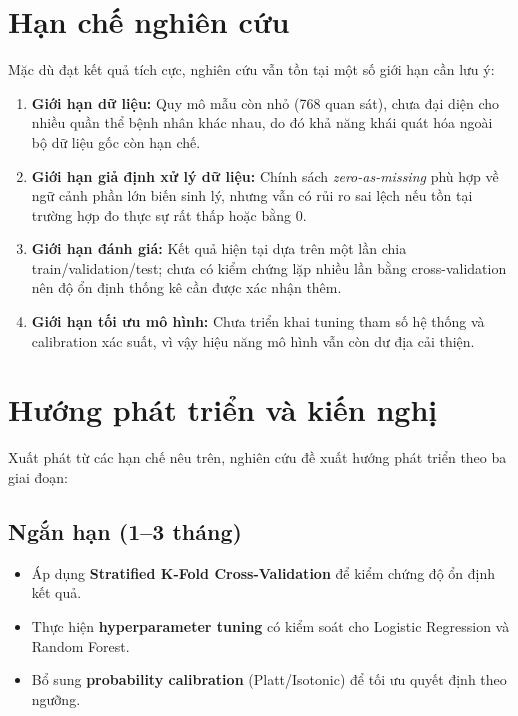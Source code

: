 \section{Hạn chế nghiên cứu}
Mặc dù đạt kết quả tích cực, nghiên cứu vẫn tồn tại một số giới hạn cần lưu ý:
\begin{enumerate}[leftmargin=1.8em]
    \item \textbf{Giới hạn dữ liệu:} Quy mô mẫu còn nhỏ (768 quan sát), chưa đại diện cho nhiều quần thể bệnh nhân khác nhau,
    do đó khả năng khái quát hóa ngoài bộ dữ liệu gốc còn hạn chế.

    \item \textbf{Giới hạn giả định xử lý dữ liệu:} Chính sách \textit{zero-as-missing} phù hợp về ngữ cảnh phần lớn biến sinh lý,
    nhưng vẫn có rủi ro sai lệch nếu tồn tại trường hợp đo thực sự rất thấp hoặc bằng 0.

    \item \textbf{Giới hạn đánh giá:} Kết quả hiện tại dựa trên một lần chia train/validation/test; chưa có kiểm chứng lặp nhiều lần
    bằng cross-validation nên độ ổn định thống kê cần được xác nhận thêm.

    \item \textbf{Giới hạn tối ưu mô hình:} Chưa triển khai tuning tham số hệ thống và calibration xác suất,
    vì vậy hiệu năng mô hình vẫn còn dư địa cải thiện.
\end{enumerate}

\section{Hướng phát triển và kiến nghị}
Xuất phát từ các hạn chế nêu trên, nghiên cứu đề xuất hướng phát triển theo ba giai đoạn:

\subsection{Ngắn hạn (1--3 tháng)}
\begin{itemize}[leftmargin=1.5em]
    \item Áp dụng \textbf{Stratified K-Fold Cross-Validation} để kiểm chứng độ ổn định kết quả.
    \item Thực hiện \textbf{hyperparameter tuning} có kiểm soát cho Logistic Regression và Random Forest.
    \item Bổ sung \textbf{probability calibration} (Platt/Isotonic) để tối ưu quyết định theo ngưỡng.
\end{itemize}


